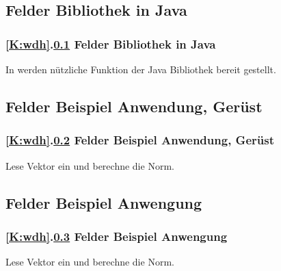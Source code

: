 \documentclass[9pt,german]{beamer}%
\begin{document}
\def\stitle{Felder Bibliothek in Java}
\subsection{\stitle}\label{S:bequem}
\begin{frame}[t]%
  \frametitle{\ref{K:wdh}.\ref{S:bequem} \stitle}
\medskip

In  werden n\"utzliche Funktion der Java Bibliothek bereit gestellt.


\end{frame}


\def\stitle{Felder Beispiel Anwendung, Ger\"ust}
\subsection{\stitle}\label{S:BeispielG}
\begin{frame}[t]%
  \frametitle{\ref{K:wdh}.\ref{S:BeispielG} \stitle}
\medskip

Lese Vektor ein und berechne die Norm.


\end{frame}


\def\stitle{Felder Beispiel Anwengung}
\subsection{\stitle}\label{S:Beispiel}
\begin{frame}[t]%
  \frametitle{\ref{K:wdh}.\ref{S:Beispiel} \stitle}
\medskip

Lese Vektor ein und berechne die Norm.


\end{frame}
\end{document}
